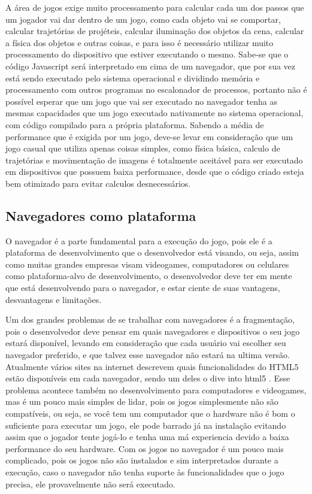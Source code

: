 A área de jogos exige muito processamento para calcular
cada um dos passos que um jogador vai dar dentro de um jogo, como cada
objeto vai se comportar, calcular trajetórias de projéteis, calcular
iluminação dos objetos da cena, calcular a física dos objetos e outras
coisas, e para isso é necessário utilizar muito processamento do
dispositivo que estiver executando o mesmo.
Sabe-se que o código Javascript será interpretado em cima de um navegador, que por sua vez está sendo
executado pelo sistema operacional e dividindo memória e processamento
com outros programas no escalonador de processos, portanto não
é possível esperar que um jogo que vai ser executado no navegador tenha as mesmas
capacidades que um jogo executado nativamente no sistema
operacional, com código compilado para a própria plataforma.
Sabendo a média de performance que é exigida por um jogo,
deve-se levar em consideração que um jogo casual que utiliza apenas
coisas simples, como física básica, calculo de trajetórias e
movimentação de imagens é totalmente aceitável para ser executado em
dispositivos que possuem baixa performance, desde que o código criado
esteja bem otimizado para evitar calculos desnecessários.

\subsection{Navegadores como plataforma}

O navegador é a parte fundamental para a execução do jogo, pois
ele é a plataforma de desenvolvimento que o desenvolvedor está visando,
ou seja, assim como muitas grandes empresas visam videogames,
computadores ou celulares como plataforma-alvo de desenvolvimento, o
desenvolvedor deve ter em mente que está desenvolvendo para o
navegador, e estar ciente de suas vantagens, desvantagens e
limitações.

Um dos grandes problemas de se trabalhar com navegadores é a
fragmentação, pois o desenvolvedor deve pensar em quais navegadores e
dispositivos o seu jogo estará disponível, levando em consideração
que cada usuário vai escolher seu navegador preferido, e que talvez
esse navegador não estará na ultima versão. Atualmente vários sites na
internet descrevem quais funcionalidades do HTML5 estão disponíveis em
cada navegador, sendo um deles o dive into html5 \cite{website:diveintohtml5}.
Esse problema acontece também no desenvolvimento para computadores e
videogames, mas é um pouco mais simples de lidar, pois os jogos
simplesmente não são compatíveis, ou seja, se você tem um computador
que o hardware não é bom o suficiente para executar um jogo, ele pode
barrado já na instalação evitando assim que o jogador tente jogá-lo e
tenha uma má experiencia devido a baixa performance do seu hardware.
Com os jogos no navegador é um pouco mais complicado, pois os jogos
não são instalados e sim interpretados durante a execução, caso o navegador não tenha suporte às funcionalidades que o
jogo precisa, ele provavelmente não será executado.

